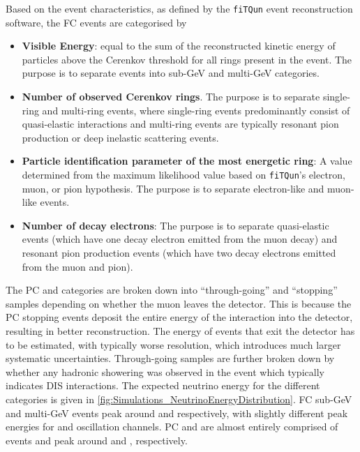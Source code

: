 Based on the event characteristics, as defined by the \texttt{fiTQun} event reconstruction software, the FC events are categorised by

\begin{itemize}
    \item \textbf{Visible Energy}: equal to the sum of the reconstructed kinetic energy of particles above the Cerenkov threshold for all rings present in the event. The purpose is to separate events into sub-GeV and multi-GeV categories. 
    \item \textbf{Number of observed Cerenkov rings}. The purpose is to separate single-ring and multi-ring events, where single-ring events predominantly consist of quasi-elastic interactions and multi-ring events are typically resonant pion production or deep inelastic scattering events.
    \item \textbf{Particle identification parameter of the most energetic ring}: A value determined from the maximum likelihood value based on \texttt{fiTQun}'s electron, muon, or pion hypothesis. The purpose is to separate electron-like and muon-like events.
    \item \textbf{Number of decay electrons}: The purpose is to separate quasi-elastic events (which have one decay electron emitted from the muon decay) and resonant pion production events (which have two decay electrons emitted from the muon and pion).
\end{itemize}

The PC and  categories are broken down into ``through-going'' and ``stopping'' samples depending on whether the muon leaves the detector. This is because the PC stopping events deposit the entire energy of the interaction into the detector, resulting in better reconstruction. The energy of events that exit the detector has to be estimated, with typically worse resolution, which introduces much larger systematic uncertainties. Through-going  samples are further broken down by whether any hadronic showering was observed in the event which typically indicates DIS interactions. The expected neutrino energy for the different categories is given in \autoref{fig:Simulations_NeutrinoEnergyDistribution}. FC sub-GeV and multi-GeV events peak around  and  respectively, with slightly different peak energies for  and \quickmath{\nu_{\mu}} oscillation channels. PC and  are almost entirely comprised of \quickmath{\nu_{\mu}} events and peak around  and , respectively.

